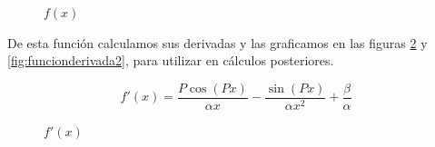 \documentclass[11pt,a4paper]{article}
\begin{document}
\begin{figure}[H]
	\caption{\(f(x)\)}
	\label{fig:funcion}
\end{figure}

De esta función calculamos sus derivadas y las graficamos en las figuras \ref{fig:funcionderivada} y \ref{fig:funcionderivada2}, para utilizar en cálculos posteriores.

\[ f'(x) = \frac{P \cos{(P x)}}{\alpha x} - \frac{ \sin{(P x)}}{\alpha x^2} + \frac{\beta}{\alpha} \]

\begin{figure}[H]
	\caption{\(f'(x)\)}
	\label{fig:funcionderivada}
\end{figure}
\end{document}
